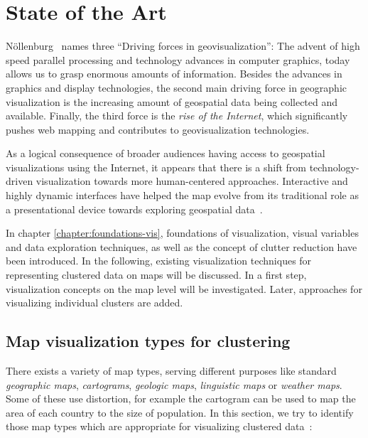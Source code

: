 
%
%

\chapter{State of the Art}
\label{state-vis}

N\"{o}llenburg~\cite{noellenburg11geovis} names three ``Driving forces in geovisualization'': The advent of high speed parallel processing and technology advances in computer graphics, today allows us to grasp enormous amounts of information. Besides the advances in graphics and display technologies, the second main driving force in geographic visualization is the increasing amount of geospatial data being collected and available. Finally, the third force is the \textit{rise of the Internet}, which significantly pushes web mapping and contributes to geovisualization technologies.

As a logical consequence of broader audiences having access to geospatial visualizations using the Internet, it appears that there is a shift from technology-driven visualization towards more human-centered approaches. Interactive and highly dynamic interfaces have helped the map evolve from its traditional role as a presentational device towards exploring geospatial data~\cite{noellenburg11geovis, vislecture}.

In chapter \ref{chapter:foundations-vis}, foundations of visualization, visual variables and data exploration techniques, as well as the concept of clutter reduction have been introduced. In the following, existing visualization techniques for representing clustered data on maps will be discussed. In a first step, visualization concepts on the map level will be investigated. Later, approaches for visualizing individual clusters are added. 

\section{Map visualization types for clustering}
\label{chapter:map-vis}

There exists a variety of map types, serving different purposes like standard \textit{geographic maps}, \textit{cartograms}, \textit{geologic maps}, \textit{linguistic maps} or \textit{weather maps}. Some of these use distortion, for example the cartogram can be used to map the area of each country to the size of population. In this section, we try to identify those map types which are appropriate for visualizing clustered data~\cite{noellenburg11geovis, wiki:map-types}:

